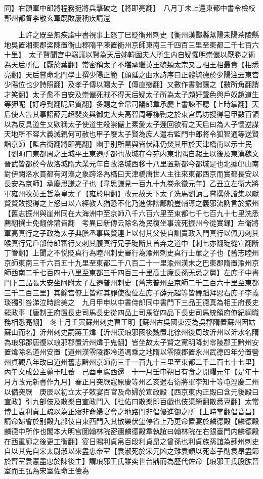 同】右領軍中郎將程務挺將兵擊破之【將即亮翻】　八月丁未上還東都中書令檢校鄯州都督李敬玄軍既敗屢稱疾請還

　　上許之既至無疾詣中書視事上怒丁巳貶衡州刺史【衡州漢酃縣蒸陽耒陽茶陵縣地吳置湘東郡梁陳置衡山郡隋平陳置衡州京師東南三千四百三里至東都二千七百六十里】　太子賢聞宫中竊議以賢為天后姊韓國夫人所生内自疑懼明崇儼以厭勝之術為天后所信【厭於葉翻】常密稱太子不堪承繼英王貌類太宗又言相王相最貴【相悉亮翻】天后嘗命北門學士撰少陽正範【顔延之曲水詩序曰正體毓德於少陽注云東宫少陽位也少詩照翻】及孝子傳以賜太子【傳直戀翻】又數作書誚讓之【數所角翻誚才笑翻】太子愈不自安及崇儼死賊不得天后疑太子所為太子頗好聲色與戶奴趙道生等狎昵【好呼到翻昵尼質翻】多賜之金帛司議郎韋承慶上書諫不聽【上時掌翻】天后使人告其事詔薛元超裴炎與御史大夫高智周等襍鞫之於東宫馬坊搜得皂甲數百領以為反具道生又欵稱太子使道生殺崇儼上素愛太子遲回欲宥之天后曰為人子懷逆謀天地所不容大義滅親何可赦也甲子廢太子賢為庶人遣右監門中郎將令狐智通等送賢詣京師【監古銜翻將即亮翻】幽于别所黨與皆伏誅仍焚其甲於天津橋南以示士民【劉昫曰東都周之王城平王東遷所都也故城在今苑内東北隅自赧王以後及東漢魏文晉武皆都於今故洛城隋大業元年自故洛城西移十八里置新都今都城是也北據邙山南對伊闕洛水貫都有河漢之象跨洛為橋曰天津橋唐世人主往來東都西京而實都長安以長安為京師】承慶思謙之子也【韋思謙見一百九十九卷永徽元年】乙丑立左衛大將軍雍州牧英王哲為皇太子【雍於用翻】改元赦天下太子洗馬劉訥言嘗撰俳諧集以獻賢賢敗搜得之上怒曰以六經教人猶恐不化乃進俳諧鄙說豈輔導之義邪流訥言於振州【舊志振州與崖州同在大海洲中至京師八千六百六里至東都七千七百九十七里洗悉薦翻撰士免翻俳蒲皆翻　考異曰新傳云除名為民復坐事流死振州今從實録】左衛將軍高真行之子政為太子典膳丞事與賢連上以付其父使自訓責政入門真行以佩刀刺其喉真行兄戶部侍郎審行又刺其腹真行兄子琁斷其首弃之道中【刺七亦翻琁從宣翻斷丁管翻】上聞之不悦貶真行為睦州刺史審行為渝州刺史真行士亷之子也【舊志睦州京師東南三千六百五十九里至東都二千八百二十一里渝州漢末之巴東郡隋置渝州京師西南二千七百四十八里至東都三千四百三十里高士廉長孫无忌之舅】左庶子中書門下三品張大安坐阿附太子左遷普州刺史【舊志普州至京師二千三百六十里至東都三千二百三里】其餘宫僚上皆釋其罪使復位左庶子薛元超等皆舞蹈拜恩右庶子李義琰獨引咎涕泣時論美之　九月甲申以中書侍郎同中書門下三品王德真為相王府長史罷政事【唐制王府置長史司馬長史從四品上司馬從四品下長史司馬統領府僚紀綱職務相悉亮翻】　冬十月壬寅蘇州刺史曹王明【蘇州古吳國東漢為吳郡隋置蘇州因姑蘇山而名】沂州刺史嗣蔣王煒【沂州漢琅邪國後魏置北徐州後周改沂州以沂水名隋為琅邪郡唐復以琅邪郡置沂州煒于鬼翻】皆坐故太子賢之黨明降封零陵郡王黔州安置煒除名道州安置【道州漢零陵郡冷道馮乘之地隋以零陵郡置永州武德四年分置營州貞觀八年改曰道州舊志黔州京師南三千一百九十三里至東都二千二百七十七里】　丙午文成公主薨于吐蕃　己酉車駕西還　十一月壬申朔日有食之開耀元年【是年十月方改元新書作九月】春正月突厥寇原慶等州乙亥遣右衛將軍李知十等屯涇慶二州以備突厥　庚辰以初立太子敕宴百官及命婦於宣政殿【西京東内正殿曰含元後殿曰宣政】引九部伎及散樂自宣政門入【杜佑曰散樂即百戱也伎渠綺翻散悉亶翻】太常博士袁利貞上疏以為正寢非命婦宴會之地路門非倡優進御之所【上時掌翻倡音昌】請命婦會於别殿九部伎自東西門入其散樂伏望停省上乃更命置宴於麟德殿【麟德殿麟德中所作也閣本大明宫圖翰林院密邇麟德殿韋執誼曰翰林院在右銀臺門内麟德殿在西重廊之後更工衡翻】宴日賜利貞帛百段利貞昂之曾孫也利貞族孫誼為蘇州刺史自以其先自宋太尉淑以來盡忠帝室【袁淑死於宋元凶之難袁顗以死奉子勛袁昂盡節於齊室袁憲盡忠於陳後主】謂琅邪王氏雖奕世台鼎而為歷代佐命【琅邪王氏股肱晉室而王弘為宋室佐命王儉為